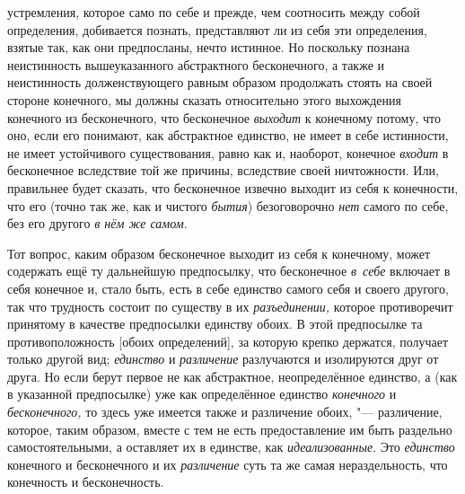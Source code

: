 устремления, которое само по себе и прежде, чем соотносить между собой
определения, добивается познать, представляют ли из себя эти определения,
взятые так, как они предпосланы, нечто истинное. Но поскольку познана
неистинность вышеуказанного абстрактного бесконечного, а также и
неистинность долженствующего равным образом продолжать стоять на своей
стороне конечного, мы должны сказать относительно этого выхождения
конечного из бесконечного, что бесконечное
{\em выходит} к конечному потому, что оно, если его
понимают, как абстрактное единство, не имеет в себе истинности, не имеет
устойчивого существования, равно как и, наоборот, конечное
{\em входит} в бесконечное вследствие той же причины,
вследствие своей ничтожности. Или, правильнее будет сказать, что
бесконечное извечно выходит из себя к конечности, что его (точно так же,
как и чистого {\em бытия}) безоговорочно
{\em нет} самого по себе, без его другого {\em в нём же самом}.

Тот вопрос, каким образом бесконечное выходит из себя к конечному, может
содержать ещё ту дальнейшую предпосылку, что бесконечное
{\em в~себе} включает в себя конечное и, стало быть,
есть в себе единство самого себя и своего другого, так что трудность
состоит по существу в их {\em разъединении,} которое
противоречит принятому в качестве предпосылки единству обоих. В этой
предпосылке та противоположность [обоих определений], за которую крепко
держатся, получает только другой вид; {\em единство} и
{\em различение} разлучаются и изолируются друг от
друга. Но если берут первое не как абстрактное, неопределённое единство, а
(как в указанной предпосылке) уже как определённое единство
{\em конечного} и {\em бесконечного,} то здесь уже имеется также и
различение обоих, "--- различение, которое, таким образом, вместе с тем не
есть предоставление им быть раздельно самостоятельными, а оставляет их в
единстве, как {\em идеализованные}. Это {\em единство} конечного и
бесконечного и их {\em различение} суть та же самая нераздельность,
что конечность и бесконечность.


